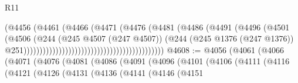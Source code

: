 \begin{lexlean}{R11}
\begin{coremodule}
{{{{{{{{{{{{{{{{{{{{{{{{{{{{{{{{{{{{{{{{{{{{{{{{{{{{{{{{{{{{{{{{{{{{{{{{{{{{{{{{{{                                                                  (@4456
                                                                    (@4461
                                                                      (@4466
                                                                        (@4471
                                                                          (@4476
                                                                            (@4481
                                                                              (@4486
                                                                                (@4491
                                                                                  (@4496
                                                                                    (@4501
                                                                                      (@4506
                                                                                        (@244
                                                                                          (@245
                                                                                            @4507
                                                                                            (@247
                                                                                              @4507))
                                                                                          (@244
                                                                                            (@245
                                                                                              @1376
                                                                                              (@247
                                                                                                @1376))
                                                                                            @251))))))))))))))))))))))))))))))))))))))))))))
@4608 := @4056
    (@4061
      (@4066
        (@4071
          (@4076
            (@4081
              (@4086
                (@4091
                  (@4096
                    (@4101
                      (@4106
                        (@4111
                          (@4116
                            (@4121
                              (@4126
                                (@4131
                                  (@4136
                                    (@4141
                                      (@4146
                                        (@4151
}}}}}}}}}}}}}}}}}}}}}}}}}}}}}}}}}}}}}}}}}}}}}}}}}}}}}}}}}}}}}}}}}}}}}}}}}}}}}}}}}}
\end{coremodule}
\end{lexlean}
